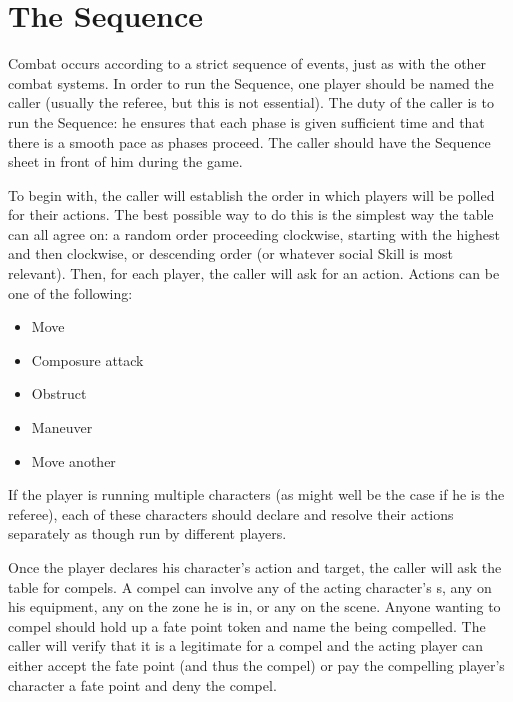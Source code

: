\iflandscape{}{\vfil}
\section{The Sequence}\label{sec:social-combat-sequence}

Combat occurs according to a strict sequence of events, just as with the other combat systems. In order to run the Sequence, one player should be named the caller (usually the referee, but this is not essential). The duty of the caller is to run the Sequence: he ensures that each phase is given sufficient time and that there is a smooth pace as phases proceed. The caller should have the Sequence sheet in front of him during the game.



To begin with, the caller will establish the order in which players will be polled for their actions. The best possible way to do this is the simplest way the table can all agree on: a random order proceeding clockwise, starting with the highest  and then clockwise, or descending order  (or whatever social Skill is most relevant). Then, for each player, the caller will ask for an action. Actions can be one of the following:

\begin{itemize}
\item Move
\item Composure attack
\item Obstruct
\item Maneuver
\item Move another
\end{itemize}

If the player is running multiple characters (as might well be the case if he is the referee), each of these characters should declare and resolve their actions separately as though run by different players.

Once the player declares his character's action and target, the caller will ask the table for compels. A compel can involve any of the acting character's \Aspect{}s, any \Aspect{} on his equipment, any \Aspect{} on the zone he is in, or any \Aspect{} on the scene. Anyone wanting to compel should hold up a fate point token and name the \Aspect{} being compelled. The caller will verify that it is a legitimate \Aspect{} for a compel and the acting player can either accept the fate point (and thus the compel) or pay the compelling player's character a fate point and deny the compel.

